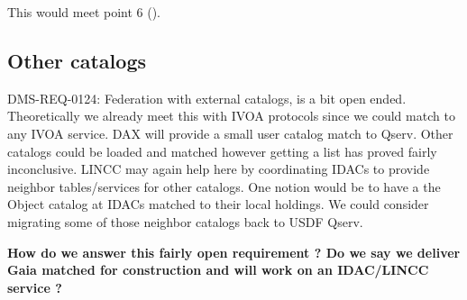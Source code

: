 This would meet  point 6  ().

\subsection{Other catalogs}

DMS-REQ-0124: Federation with external catalogs, is a bit open ended.
Theoretically we already meet this with IVOA protocols since we could match to any IVOA service.
DAX will provide a small user catalog match to Qserv.
Other catalogs could be loaded and matched however getting a list has proved fairly inconclusive.
LINCC may again help here by coordinating IDACs to provide neighbor tables/services for other catalogs.
One notion would be to have a the Object catalog at IDACs matched to their local holdings.
We could consider migrating some of those neighbor catalogs back to USDF Qserv.

\textbf{How do we answer this fairly open requirement ? Do we say we deliver Gaia matched for construction and will work on an IDAC/LINCC service ?}

